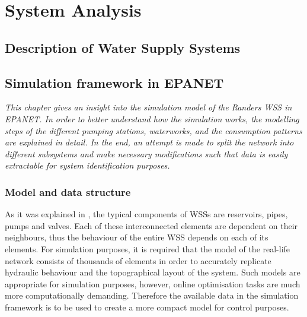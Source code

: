 
\part{System Analysis}
\label{system_analysis}

\chapter{Description of Water Supply Systems}
\label{description_of_water_supply_systems}

 





\chapter{Simulation framework in EPANET}
\label{simulation_framework_in_EPANET}

\emph{This chapter gives an insight into the simulation model of the Randers WSS in EPANET. In order to better understand how the simulation works, the modelling steps of the different pumping stations, waterworks, and the consumption patterns are explained in detail. In the end, an attempt is made to split the network into different subsystems and make necessary modifications such that data is easily extractable for system identification purposes.}


\section{Model and data structure}
\label{model_data_and_structure}

As it was explained in , the typical components of WSSs are reservoirs, pipes, pumps and valves. Each of these interconnected elements are dependent on their neighbours, thus the behaviour of the entire WSS depends on each of its elements. For simulation purposes, it is required that the model of the real-life network consists of thousands of elements in order to accurately replicate hydraulic behaviour and the topographical layout of the system. Such models are appropriate for simulation purposes, however, online optimisation tasks are much more computationally demanding. Therefore the available data in the simulation framework is to be used to create a more compact model for control purposes. 

